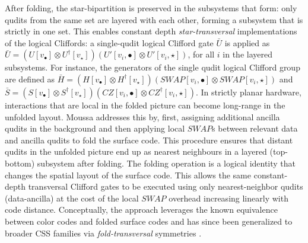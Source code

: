 After folding, the star-bipartition is preserved in the subsystems that form: only qudits from the same set are layered with each other, forming a subsystem that is strictly in one set. This enables constant depth \emph{star-transversal} implementations of the logical Cliffords: a single-qudit logical Clifford gate $\bar{U}$ is applied as $\bar{U} = (U[v_\bullet] \otimes U^\dagger[v_\star])(U'[v_i,\bullet] \otimes U'[v_i,\star] )$, for all $i$ in the layered subsystems. For instance, the generators of the single qudit logical Clifford group are defined as
$\bar H = (H[v_\bullet]\otimes H^\dagger[v_\star])(SWAP[v_i,\bullet] \otimes SWAP[v_i,\star] )$ and
$\bar S = (S[v_\bullet]\otimes S^\dagger[v_\star])(CZ[v_i,\bullet] \otimes CZ^\dagger[v_i,\star] )$. In strictly planar hardware, interactions that are local in the folded picture can become long-range in the unfolded layout. Moussa addresses this by, first, assigning additional ancilla qudits in the background and then applying local $SWAP$s between relevant data and ancilla qudits to fold the surface code. This procedure ensures that distant qudits in the unfolded picture end up as nearest neighbours in a layered (top-bottom) subsystem after folding. The folding operation is a logical identity that changes the spatial layout of the surface code. This allows the same constant-depth transversal Clifford gates to be executed using only nearest-neighbor qudits (data-ancilla) at the cost of the local $SWAP$ overhead increasing linearly with code distance. Conceptually, the approach leverages the known equivalence between color codes and folded surface codes and has since been generalized to broader CSS families via \emph{fold-transversal} symmetries  \cite{Kubica2015, BreuckmannBurton2024}. 

